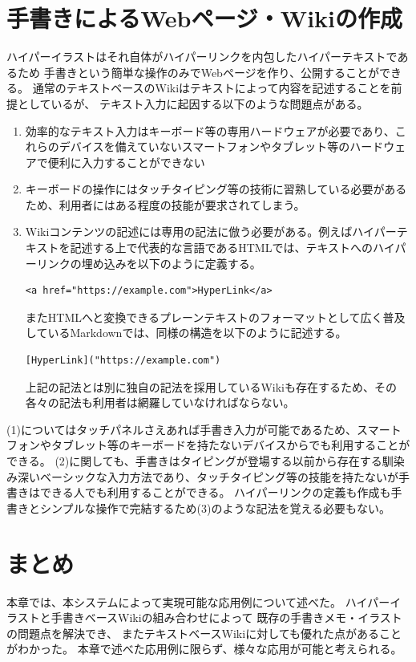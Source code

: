 \section{手書きによるWebページ・Wikiの作成}
\label{tegakiwiki}
ハイパーイラストはそれ自体がハイパーリンクを内包したハイパーテキストであるため
手書きという簡単な操作のみでWebページを作り、公開することができる。
通常のテキストベースのWikiはテキストによって内容を記述することを前提としているが、
テキスト入力に起因する以下のような問題点がある。
\begin{enumerate}
    \item 効率的なテキスト入力はキーボード等の専用ハードウェアが必要であり、これらのデバイスを備えていないスマートフォンやタブレット等のハードウェアで便利に入力することができない
    \item キーボードの操作にはタッチタイピング等の技術に習熟している必要があるため、利用者にはある程度の技能が要求されてしまう。
    \item Wikiコンテンツの記述には専用の記法に倣う必要がある。例えばハイパーテキストを記述する上で代表的な言語であるHTMLでは、テキストへのハイパーリンクの埋め込みを以下のように定義する。
    \begin{lstlisting}[caption=htmlにおけるハイパーリンクの定義, label=htmlhyperlinking]
        <a href="https://example.com">HyperLink</a>
    \end{lstlisting}
    またHTMLへと変換できるプレーンテキストのフォーマットとして広く普及しているMarkdownでは、同様の構造を以下のように記述する。
    \begin{lstlisting}[caption=htmlにおけるハイパーリンクの定義, label=mdhyperlinking]
        [HyperLink]("https://example.com")
    \end{lstlisting}
    上記の記法とは別に独自の記法を採用しているWikiも存在するため、その各々の記法も利用者は網羅していなければならない。
\end{enumerate}

(1)についてはタッチパネルさえあれば手書き入力が可能であるため、スマートフォンやタブレット等のキーボードを持たないデバイスからでも利用することができる。
(2)に関しても、手書きはタイピングが登場する以前から存在する馴染み深いベーシックな入力方法であり、タッチタイピング等の技能を持たないが手書きはできる人でも利用することができる。
ハイパーリンクの定義も作成も手書きとシンプルな操作で完結するため(3)のような記法を覚える必要もない。

\section{まとめ}
本章では、本システムによって実現可能な応用例について述べた。
ハイパーイラストと手書きベースWikiの組み合わせによって 既存の手書きメモ・イラストの問題点を解決でき、
またテキストベースWikiに対しても優れた点があることがわかった。
本章で述べた応用例に限らず、様々な応用が可能と考えられる。